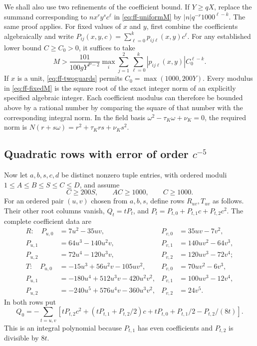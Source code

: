 \documentclass[12pt]{article}
\numberwithin{equation}{section}
\begin{document}
We shall also use two refinements of the coefficient bound. If $Y\ge qX$, replace the summand corresponding to
$n x^ry^sc^\ell$ in \eqref{eq:ff-uniformM} by
$|n|q^{-r}1000^{\ell-k}$. The same proof applies.
For fixed values of $x$ and $y$, first combine the coefficients algebraically and
write
$P_{ij}(x,y,c)=\sum_{\ell=0}^kp_{ij\ell}(x,y)c^\ell$.
For any established lower bound $C\ge C_0>0$, it suffices to take
\begin{equation}\label{eq:ff-fixedM}
 M>\frac{101}{100gY^{P-2}}
       \max_i\sum_{j=1}^2\sum_{\ell=0}^k
                    |p_{ij\ell}(x,y)|C_0^{\ell-k}.
\end{equation}
If $x$ is a unit, \eqref{eq:ff-twoguards} permits
$C_0=\max(1000,200Y)$.
Every modulus in \eqref{eq:ff-fixedM} is the square root of the exact
integer norm of an explicitly specified algebraic integer. Each coefficient modulus can therefore be bounded above by a rational number by comparing the square of that number with the corresponding integral norm. In the field basis $\omega^2-\tau_K\omega+\nu_K=0$, the required norm
is $N(r+s\omega)=r^2+\tau_Krs+\nu_Ks^2$.

\subsection[Quadratic rows and their error bounds]{Quadratic rows with error of order $c^{-5}$}

Now let $a,b,s,c,d$ be distinct nonzero tuple entries, with ordered
moduli $1\le A\le B\le S\le C\le D$, and assume
\begin{equation*}
 C\ge200S,\qquad AC\ge1000,\qquad C\ge1000.
\end{equation*}
For an ordered pair $(u,v)$ chosen from $a,b,s$, define rows $R_{uv},T_{uv}$ as follows. Their other root columns vanish, $Q_t=tP_t$, and
$P_t=P_{t,0}+P_{t,1}c+P_{t,2}c^2$. The complete coefficient data are
\begin{align*}
 R:\quad P_{u,0}&=7u^2-35uv,&P_{v,0}&=35uv-7v^2,\\
 P_{u,1}&=64u^3-140u^2v,&P_{v,1}&=140uv^2-64v^3,\\
 P_{u,2}&=72u^4-120u^3v,&P_{v,2}&=120uv^3-72v^4;\\[2mm]
 T:\quad P_{u,0}&=-15u^3+56u^2v-105uv^2,&
 P_{v,0}&=70uv^2-6v^3,\\
 P_{u,1}&=-180u^4+512u^3v-420u^2v^2,&
 P_{v,1}&=100uv^3-12v^4,\\
 P_{u,2}&=-240u^5+576u^4v-360u^3v^2,&
 P_{v,2}&=24v^5.
\end{align*}
In both rows put
\begin{equation*}
 Q_0=-\sum_{t=u,v}\left[
 tP_{t,2}c^2+(tP_{t,1}+P_{t,2}/2)c
              +tP_{t,0}+P_{t,1}/2-P_{t,2}/(8t)\right].
\end{equation*}
This is an integral polynomial because $P_{t,1}$ has even coefficients and
$P_{t,2}$ is divisible by $8t$.
\end{document}
